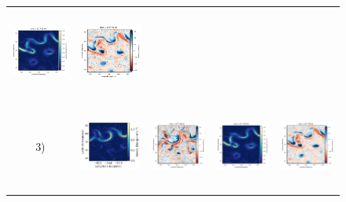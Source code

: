 \documentclass[draft]{agujournal2019}
\begin{document}
\begin{figure}[H]
\begin{center}
\begin{tabular}{ccccc}
 \includegraphics[trim={13mm 13mm 22mm 6mm},clip, width=2.9cm,height=2.9cm]{figures/plots/glorys12-f_rec_ke.png} &
 \includegraphics[trim={13mm 13mm 22mm 6mm},clip,width=2.9cm,height=2.9cm]{figures/plots/glorys12-f_rec_vort_r.png} \\
\hspace{-10mm} 3) &
 \includegraphics[trim={0 16mm 26mm 5mm},clip, width=3.3cm,height=2.9cm]{figures/plots2/glorys12-r_train_ke.png} &
 \includegraphics[trim={13mm 13mm 22mm 6mm},clip, width=2.9cm,height=2.9cm]{figures/plots/glorys12-r_train_vort_r.png} &
 \includegraphics[trim={13mm 13mm 22mm 6mm},clip, width=2.9cm,height=2.9cm]{figures/plots/glorys12-r_rec_ke.png} &
 \includegraphics[trim={13mm 13mm 22mm 6mm},clip,width=2.9cm,height=2.9cm]{figures/plots/glorys12-r_rec_vort_r.png} \\

\end{tabular}
\end{center}
\end{figure}
\end{document}
